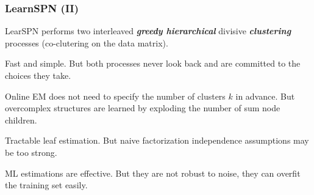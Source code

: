 \documentclass[xcolor={usenames,dvipsnames,svgnames}, compress]{beamer}
\begin{document}
\begin{frame}
  \frametitle{LearnSPN (II)}
  \footnotesize
  
  \textsf{LearSPN} performs two interleaved \textbf{\emph{greedy
      hierarchical}} divisive \textbf{\emph{clustering}}
  processes (co-clutering on the data matrix).\par\bigskip

  Fast and simple. But both processes never look back and are
  committed to the choices they take.\par\bigskip

  Online EM does not need to specify the number of clusters $k$ in
  advance. But overcomplex structures are learned by exploding the number of sum
  node children.\par\bigskip

  Tractable leaf estimation. But naive factorization independence
  assumptions may be too strong.\par\bigskip

  ML estimations are effective. But they are not robust to noise, they can overfit the training set easily.
  
  \end{frame}
\end{document}
